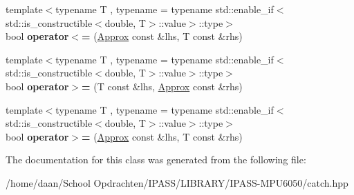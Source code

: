 \begin{DoxyCompactItemize}
\item 
\mbox{\label{classCatch_1_1Detail_1_1Approx_a6040b908588745570847d7ae8483b091}} 
{\footnotesize template$<$typename T , typename  = typename std\+::enable\+\_\+if$<$std\+::is\+\_\+constructible$<$double, T$>$\+::value$>$\+::type$>$ }\\bool {\bfseries operator$<$=} (\hyperlink{classCatch_1_1Detail_1_1Approx}{Approx} const \&lhs, T const \&rhs)
\item 
\mbox{\label{classCatch_1_1Detail_1_1Approx_affd27efc62be386daeecb7a09e828d44}} 
{\footnotesize template$<$typename T , typename  = typename std\+::enable\+\_\+if$<$std\+::is\+\_\+constructible$<$double, T$>$\+::value$>$\+::type$>$ }\\bool {\bfseries operator$>$=} (T const \&lhs, \hyperlink{classCatch_1_1Detail_1_1Approx}{Approx} const \&rhs)
\item 
\mbox{\label{classCatch_1_1Detail_1_1Approx_a5899b8a36725406701e2ebded2971ee6}} 
{\footnotesize template$<$typename T , typename  = typename std\+::enable\+\_\+if$<$std\+::is\+\_\+constructible$<$double, T$>$\+::value$>$\+::type$>$ }\\bool {\bfseries operator$>$=} (\hyperlink{classCatch_1_1Detail_1_1Approx}{Approx} const \&lhs, T const \&rhs)
\end{DoxyCompactItemize}


The documentation for this class was generated from the following file\+:\begin{DoxyCompactItemize}
\item 
/home/daan/\+School Opdrachten/\+I\+P\+A\+S\+S/\+L\+I\+B\+R\+A\+R\+Y/\+I\+P\+A\+S\+S-\/\+M\+P\+U6050/catch.\+hpp\end{DoxyCompactItemize}
